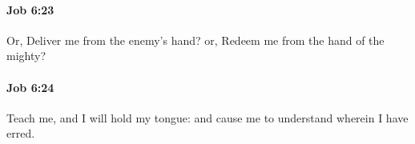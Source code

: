 		\paragraph{Job 6:23} %
			\label{JOB-6-23}

			Or, Deliver me from the enemy’s hand? or, Redeem me from the hand of the mighty?


		\paragraph{Job 6:24} %
			\label{JOB-6-24}

			Teach me, and I will hold my tongue: and cause me to understand wherein I have erred.


